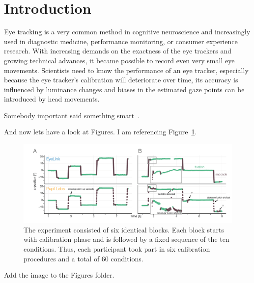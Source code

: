 \section{Introduction}

Eye tracking is a very common method in cognitive neuroscience and increasingly used in diagnostic medicine, performance monitoring, or consumer experience research.
With increasing demands on the exactness of the eye trackers and growing technical advances, it became possible to record even very small eye movements.
Scientists need to know the performance of an eye tracker, especially because the eye tracker's calibration will deteriorate over time, its accuracy is influenced by luminance changes and biases in the estimated gaze points can be introduced by head movements.


Somebody important said something smart~\citep{thaler_what_2013}.


And now lets have a look at Figures. I am referencing Figure~\ref{fig:RawSignal}.

\begin{figure}[ht]
	\centering
	\includegraphics[scale=0.4]{Figures/compare_raw_signal}
	\decoRule
	\caption[Signal of both eye-trackers]{The experiment consisted of six identical blocks. Each block starts with calibration phase and is followed by a fixed sequence of the ten conditions. Thus, each participant took part in six calibration procedures and a total of 60 conditions.}
	\label{fig:RawSignal}
\end{figure}

Add the image to the Figures folder.
